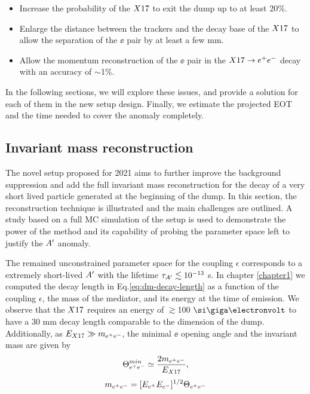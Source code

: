 \begin{itemize}
\item Increase the probability of the $X17$ to exit the dump up to at least 20\%.
\item Enlarge the distance between the trackers and the decay base of the $X17$ to allow the separation of the $\ee$ pair by at least a few mm.
\item Allow the momentum reconstruction of the $\ee$ pair in the $X17 \rightarrow e^+ e^-$ decay with an accuracy of $\sim$1\%.
\end{itemize}

In the following sections, we will explore these issues, and provide a solution for each of them in the new setup design. Finally, we estimate the projected  EOT and the time needed to cover the anomaly completely.

\subsection{Invariant mass reconstruction}
\label{ch5:sec:new-vismode-setup-invmass}

The novel setup proposed for 2021 aims to further improve the background suppression and add the full invariant mass reconstruction for the decay of a very short lived particle generated at the beginning of the dump. In this section, the reconstruction technique is illustrated and the main challenges are outlined. A study based on a full MC simulation of the setup is used to demonstrate the power of the method and its capability of probing the parameter space left to justify the $A'$ anomaly.

The remained unconstrained parameter space for the coupling $\epsilon$ corresponds to a extremely short-lived $A'$ with the lifetime $\tau_{A'} \lesssim 10^{-13}$ s. In chapter \ref{chapter1} we computed the decay length in Eq.\ref{eq:dm-decay-length} as a function of the coupling $\epsilon$, the mass of the mediator, and its energy at the time of emission.
We observe that the $X17$ requires an energy of $\gtrsim$100 $\gev$ to have a 30 mm decay length comparable to the dimension of the dump.
Additionally, as $E_{X17} \gg m_{e^+e^-}$, the minimal $\ee$ opening angle and the invariant mass are given by
\begin{equation} 
\Theta_{ e^+e^-}^{min} \simeq  \frac{2m_{e^+e^-}}{E_{X17}},
\label{eqn:angle}
\end{equation}
\begin{equation}
m_{e^+e^-} = [E_{e^+} E_{e^-}]^{1/2} \Theta_{ e^+e^-}
\label{eqn:imass}
\end{equation}

